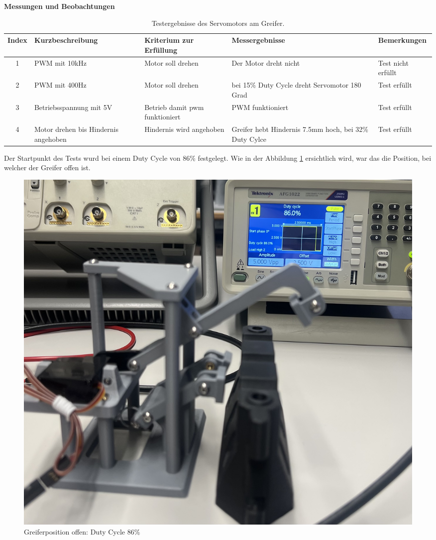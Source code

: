 \textbf{Messungen und Beobachtungen}

\begin{table}[H]
\centering
\small
\begin{tabularx}{\textwidth}{|c|X|X|X|l|}
        \hline
        \textbf{Index} & \textbf{Kurzbeschreibung} & \textbf{Kriterium zur Erfüllung} & \textbf{Messergebnisse} & \textbf{Bemerkungen} \\
        \hline
        1 & PWM mit 10kHz & Motor soll drehen & Der Motor dreht nicht & Test nicht erfüllt \\ \hline
        2 & PWM mit 400Hz & Motor soll drehen & bei 15\% Duty Cycle dreht Servomotor 180 Grad & Test erfüllt \\ \hline
        3 & Betriebsspannung mit 5V & Betrieb damit \acrshort{pwm} funktioniert  & PWM funktioniert & Test erfüllt\\ \hline
        4 & Motor drehen bis Hindernis angehoben & Hindernis wird angehoben & Greifer hebt Hindernis 7.5mm hoch, bei 32\% Duty Cylce & Test erfüllt \\ \hline
\end{tabularx}
    \caption{Testergebnisse des Servomotors am Greifer.}
\label{tab:testpunkte Servomotor}
\end{table}

\newpage

Der Startpunkt des Tests wurd bei einem Duty Cycle von 86\% festgelegt. Wie in der Abbildung \ref{fig: Greiferposition offen: Duty Cycle 86} ersichtlich wird, war das die Position, bei welcher der Greifer offen ist.

\begin{figure}[H]
    \centering
    \includegraphics[width=0.8\linewidth]{img/ServoGreifferoffen.jpeg}
    \caption{Greiferposition offen: Duty Cycle 86\%}
    \label{fig: Greiferposition offen: Duty Cycle 86}
\end{figure}

